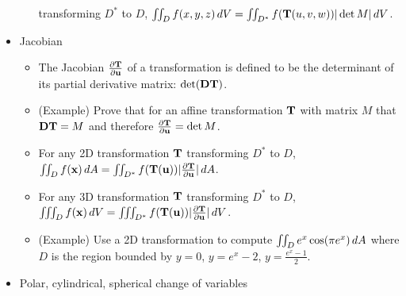 \documentclass[11pt]{article}
\begin{document}
\begin{itemize}
\begin{itemize}
            transforming \(D^*\) to \(D\),
            \(\iint_D f(x,y,z)\,d V=\iint_{D^*}f(\mathbf{T}(u,v,w))|\det M|\,d V\).
    \end{itemize}
  \item Jacobian
    \begin{itemize}
      \item The Jacobian \(\frac{\partial \mathbf{T}}{\partial \mathbf{u}}\) of a transformation
            is defined to be the determinant of its partial derivative matrix:
            \(\det(\mathbf{D}\mathbf{T})\).
      \item (Example) Prove that for an affine transformation \(\mathbf{T}\) with
            matrix \(M\) that \(\mathbf{D}\mathbf{T}=M\) and therefore
            \(\frac{\partial\mathbf{T}}{\partial\mathbf{u}}=\det M\).
      \item For any 2D transformation \(\mathbf{T}\)
            transforming \(D^*\) to \(D\),
            \(
              \iint_D f(\mathbf{x})\,d A
                =
              \iint_{D^*}f(\mathbf{T}(\mathbf{u}))|\frac{\partial\mathbf{T}}{\partial\mathbf{u}}|\,d A
            \).
      \item For any 3D transformation \(\mathbf{T}\)
            transforming \(D^*\) to \(D\),
            \(
              \iiint_D f(\mathbf{x})\,d V
                =
              \iiint_{D^*}f(\mathbf{T}(\mathbf{u}))|\frac{\partial\mathbf{T}}{\partial\mathbf{u}}|\,d V
            \).
      \item (Example) Use a 2D transformation to compute
            \(\iint_D e^x\cos(\pi e^x)\,d{A}\) where
            \(D\) is the region
            bounded by \(y=0\), \(y=e^x-2\), \(y=\frac{e^x-1}{2}\).
    \end{itemize}
  \item Polar, cylindrical, spherical change of variables
\end{itemize}
\end{document}

